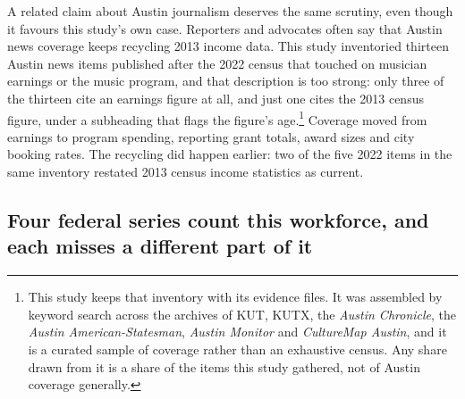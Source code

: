 A related claim about Austin journalism deserves the same scrutiny, even
though it favours this study's own case. Reporters and advocates often say
that Austin news coverage keeps recycling 2013 income data. This study
inventoried thirteen Austin news items published after the 2022 census that
touched on musician earnings or the music program, and that description is
too strong: only three of the thirteen cite an earnings figure at all, and
just one cites the 2013 census figure, under a subheading that flags the
figure's age.\footnote{This study
keeps that inventory with its evidence files.
It was assembled by keyword search across the archives of
KUT, KUTX, the \textit{Austin Chronicle}, the \textit{Austin American-Statesman},
\textit{Austin Monitor} and \textit{CultureMap Austin}, and it is a curated
sample of coverage rather than an exhaustive census. Any share drawn from it
is a share of the items this study gathered, not of Austin coverage
generally.} Coverage moved from earnings to program spending, reporting grant
totals, award sizes and city booking rates. The recycling did happen earlier:
two of the five 2022 items in the same inventory restated 2013 census income
statistics as current.

\subsection{Four federal series count this workforce, and each misses a different part of it}

